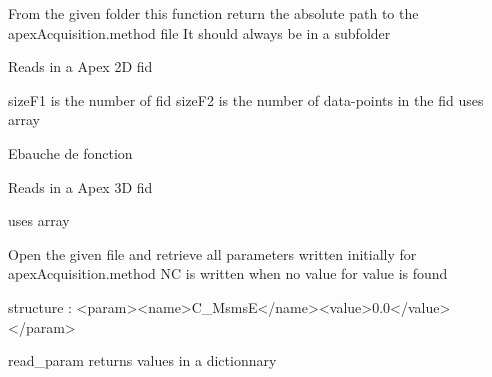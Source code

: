 \documentclass[letterpaper,10pt,openany,oneside]{sphinxmanual}
\begin{document}

\begin{fulllineitems}
\label{rst/code:File.Apex.locate_acquisition}
From the given folder this function return the absolute path to the apexAcquisition.method file
It should always be in a subfolder

\end{fulllineitems}


\begin{fulllineitems}
\label{rst/code:File.Apex.read_2D}
Reads in a Apex 2D fid

sizeF1 is the number of fid
sizeF2 is the number of data-points in the fid
uses array

\end{fulllineitems}


\begin{fulllineitems}
\label{rst/code:File.Apex.read_3D}
Ebauche de fonction

Reads in a Apex 3D fid

uses array

\end{fulllineitems}


\begin{fulllineitems}
\label{rst/code:File.Apex.read_param}
Open the given file and retrieve all parameters written initially for apexAcquisition.method
NC is written when no value for value is found

structure : \textless{}param\textgreater{}\textless{}name\textgreater{}C\_MsmsE\textless{}/name\textgreater{}\textless{}value\textgreater{}0.0\textless{}/value\textgreater{}\textless{}/param\textgreater{}

read\_param returns  values in a dictionnary

\end{fulllineitems}
\end{document}
